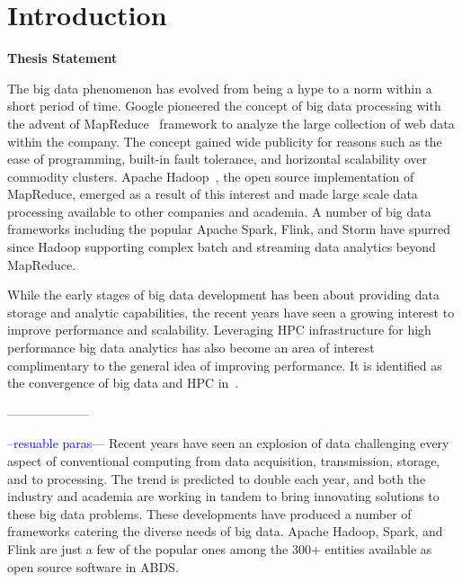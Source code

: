 \chapter{Introduction}
\label{ch:introduction}


\begin{center}
\textbf{Thesis Statement}

\end{center}


The big data phenomenon has evolved from being a hype to a norm within a short period of time. Google pioneered the concept of big data processing with the advent of MapReduce~\cite{Dean:2004:MSD:1251254.1251264} framework to analyze the large collection of web data within the company. The concept gained wide publicity for reasons such as the ease of programming, built-in fault tolerance, and horizontal scalability over commodity clusters. Apache Hadoop~\cite{White:2012:HDG:2285539}, the open source implementation of MapReduce, emerged as a result of this interest and made large scale data processing available to other companies and academia. A number of big data frameworks including the popular Apache Spark, Flink, and Storm have spurred since Hadoop supporting complex batch and streaming data analytics beyond MapReduce. 

While the early stages of big data development has been about providing data storage and analytic capabilities, the recent years have seen a growing interest to improve performance and scalability. Leveraging HPC infrastructure for high performance big data analytics  has also become an area of interest complimentary to the general idea of improving performance. It is identified as the convergence of big data and HPC in~\cite{bigdataconvergence}. 

--------------------

\textcolor{blue}{--resuable paras---}
Recent years have seen an explosion of data challenging every aspect of conventional computing from data acquisition, transmission, storage, and to processing. The trend is predicted to double each  year, and both the industry and academia are working in tandem to bring innovating solutions to these big data problems. These developments have produced a number of frameworks catering the diverse needs of big data. Apache Hadoop, Spark, and Flink are just a few of the popular ones among the 300+ entities available as open source software in \ac{ABDS}.


